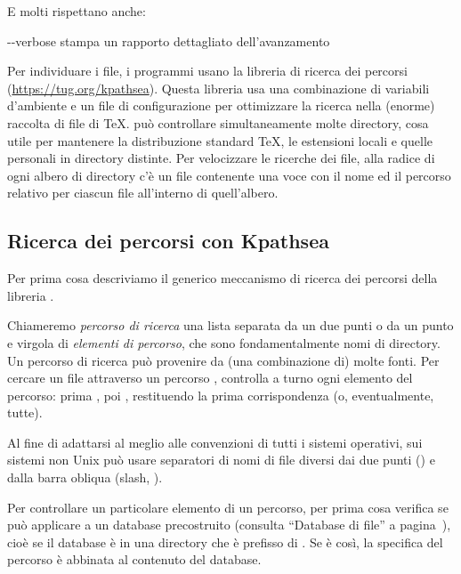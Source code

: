 \documentclass{article}
\begin{document}
E molti rispettano anche:
\begin{ttdescription}
\item[-{}-verbose] stampa un rapporto dettagliato dell'avanzamento
\end{ttdescription}

Per individuare i file, i programmi \Webc{} usano la libreria di ricerca
dei percorsi \KPS{} (\url{https://tug.org/kpathsea}). Questa libreria usa
una combinazione di variabili d'ambiente e un file di configurazione per
ottimizzare la ricerca nella (enorme) raccolta di file di \TeX{}. \Webc{}
può controllare simultaneamente molte directory, cosa utile per mantenere
la distribuzione standard \TeX{}, le estensioni locali e quelle personali
in directory distinte. Per velocizzare le ricerche dei file, alla radice
di ogni albero di directory c'è un file  contenente una voce
con il nome ed il percorso relativo per ciascun file all'interno di
quell'albero.


\subsection{Ricerca dei percorsi con Kpathsea}
\label{sec:kpathsea}

Per prima cosa descriviamo il generico meccanismo di ricerca dei percorsi
della libreria \KPS.

Chiameremo \emph{percorso di ricerca} una lista separata da un due punti o
da un punto e virgola di \emph{elementi di percorso}, che sono
fondamentalmente nomi di directory. Un percorso di ricerca può provenire
da (una combinazione di) molte fonti. Per cercare un file 
attraverso un percorso , \KPS{} controlla a turno ogni
elemento del percorso: prima , poi ,
restituendo la prima corrispondenza (o, eventualmente, tutte).

Al fine di adattarsi al meglio alle convenzioni di tutti i sistemi
operativi, sui sistemi non Unix \KPS{} può usare separatori di nomi di
file diversi dai due punti (\samp{:}) e dalla barra obliqua (slash, \samp{/}).

Per controllare un particolare elemento  di un percorso, \KPS{} per
prima cosa verifica se può applicare a  un database precostruito
(consulta ``Database di file'' a pagina~\pageref{sec:filename-database}),
cioè se il database è in una directory che è prefisso di . Se è
così, la specifica del percorso è abbinata al contenuto del
database.
\end{document}
